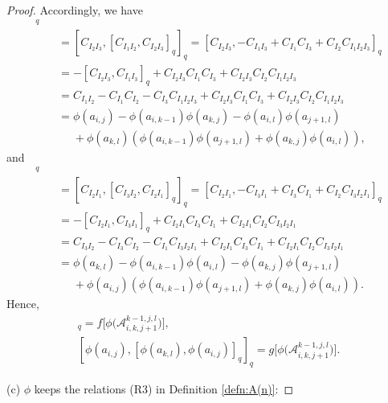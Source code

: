\documentclass[10pt,a4paper]{amsart}
\numberwithin{equation}{section}
\def\lr#1{\left[#1\right]}
\def\lrb#1{\left(#1\right)}
\def\A{\mathscr{A}}
\begin{document}
\begin{proof}
Accordingly, we have
 \begin{gather*}
 [\phi(a_{k, l}), {\lr{\phi(a_{i, j}), \phi(a_{k, l})}}_q]_q\\
 \qquad=[ C_{I_{2}I_3}, \lr{ C_{I_{1}I_2} , C_{I_{2}I_3}}_q ]_q
 =\lr{ C_{I_{2}I_3}, -C_{I_1I_3}+C_{I_1}C_{I_3}+C_{I_2}C_{I_1I_2I_3} }_q\\
\qquad =-\lr{ C_{I_{2}I_3}, C_{I_1I_3}}_q+C_{I_{2}I_3} C_{I_1}C_{I_3} + C_{I_{2}I_3}C_{I_2}C_{I_1I_2I_3} \\
 \qquad= C_{I_1I_2}-C_{I_1}C_{I_2}-C_{I_3}C_{I_1I_2I_3}+C_{I_{2}I_3} C_{I_1}C_{I_3} + C_{I_{2}I_3}C_{I_2}C_{I_1I_2I_3} \\
\qquad =\phi\lrb{a_{i, j}}-\phi\lrb{a_{i, k-1}}\phi\lrb{a_{k, j}}-\phi\lrb{a_{i, l}}\phi\lrb{a_{j+1, l}}\\
\phantom{ \qquad=}{} + \phi\lrb{a_{k, l}} \lrb{\phi\lrb{a_{i, k-1}}\phi\lrb{a_{j+1, l}} +\phi\lrb{ a_{k, j }} \phi\lrb{a_{i, l}}},
 \end{gather*}
and
\begin{gather*}
[\phi\lrb{a_{i, j}}, {\lr{\phi\lrb{a_{k, l}}, \phi\lrb{a_{i, j}}}}_q]_q\\
 \qquad=[ C_{I_{2}I_1}, \lr{ C_{I_{3}I_2} , C_{I_{2}I_1}}_q ]_q
 =\lr{ C_{I_{2}I_1}, -C_{I_3I_1}+C_{I_3}C_{I_1}+C_{I_2}C_{I_3I_2I_1} }_q\\
\qquad =-\lr{ C_{I_{2}I_1}, C_{I_3I_1}}_q+C_{I_{2}I_1} C_{I_3}C_{I_1} + C_{I_{2}I_1}C_{I_2}C_{I_3I_2I_1} \\
\qquad = C_{I_3I_2}-C_{I_3}C_{I_2}-C_{I_1}C_{I_3I_2I_1} +C_{I_{2}I_1} C_{I_3}C_{I_1} + C_{I_{2}I_1}C_{I_2}C_{I_3I_2I_1} \\
 \qquad=\phi\lrb{a_{k, l}}-\phi\lrb{a_{i, k-1}}\phi\lrb{a_{i, l}}-\phi\lrb{a_{k, j}}\phi\lrb{a_{j+1, l}}\\
\phantom{ \qquad=}{} + \phi\lrb{a_{i, j}}\lrb{\phi\lrb{a_{i, k-1}}\phi\lrb{a_{j+1, l}} + \phi\lrb{a_{k, j }}\phi\lrb{a_{i, l}}}.
 \end{gather*}
Hence,
\begin{gather*}
[\phi\lrb{a_{k, l}}, {\lr{\phi\lrb{a_{i, j}}, \phi\lrb{a_{k,l}}}}_q]_q=f\bigl[\phi\bigl(\A_{i,k,j+1}^{k-1,j,l}\bigr)\bigr],\\
[\phi\lrb{a_{i, j}}, {\lr{\phi\lrb{a_{k, l}}, \phi\lrb{a_{i, j}}}}_q]_q=g\bigl[\phi\bigl(\A_{i,k,j+1}^{k-1,j,l}\bigr)\bigr].
\end{gather*}

(c) $\phi$ keeps the relations (R3) in Definition \ref{defn:A(n)}:


\end{proof}
\end{document}
